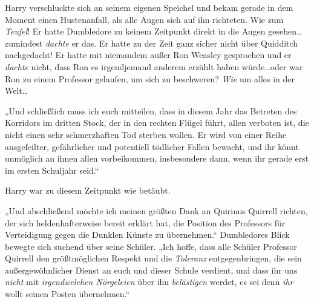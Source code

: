 Harry verschluckte sich an seinem eigenen Speichel und bekam gerade in dem Moment einen Hustenanfall, als alle Augen sich auf ihn richteten. Wie zum \emph{Teufel}! Er hatte Dumbledore zu keinem Zeitpunkt direkt in die Augen gesehen…zumindest \emph{dachte} er das. Er hatte zu der Zeit ganz sicher nicht über Quidditch nachgedacht! Er hatte mit niemandem außer Ron Weasley gesprochen und er \emph{dachte} nicht, dass Ron es irgendjemand anderem erzählt haben würde…oder war Ron zu einem Professor gelaufen, um sich zu beschweren? \emph{Wie} um alles in der Welt…

„Und schließlich muss ich euch mitteilen, dass in diesem Jahr das Betreten des Korridors im dritten Stock, der in den rechten Flügel führt, allen verboten ist, die nicht einen sehr schmerzhaften Tod sterben wollen. Er wird von einer Reihe ausgefeilter, gefährlicher und potentiell tödlicher Fallen bewacht, und ihr könnt unmöglich an ihnen allen vorbeikommen, insbesondere dann, wenn ihr gerade erst im ersten Schuljahr seid.“

Harry war zu diesem Zeitpunkt wie betäubt.

„Und abschließend möchte ich meinen größten Dank an Quirinus Quirrell richten, der sich heldenhafterweise bereit erklärt hat, die Position des Professors für Verteidigung gegen die Dunklen Künste zu übernehmen.“ Dumbledores Blick bewegte sich suchend über seine Schüler. „Ich hoffe, dass alle Schüler Professor Quirrell den größtmöglichen Respekt und die \emph{Toleranz} entgegenbringen, die sein außergewöhnlicher Dienst an euch und dieser Schule verdient, und dass ihr uns \emph{nicht} mit \emph{irgendwelchen Nörgeleien} über ihn \emph{belästigen} werdet, es sei denn \emph{ihr} wollt seinen Posten übernehmen.“

